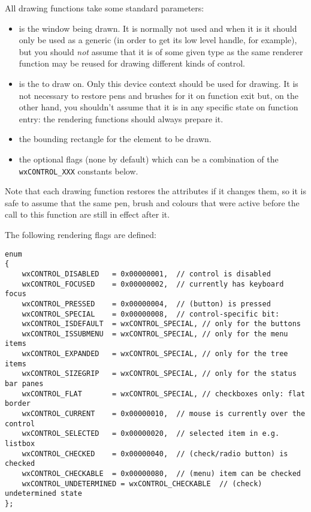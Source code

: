 All drawing functions take some standard parameters:
\begin{itemize}
\item {} is the window being drawn. It is normally not used and when
it is it should only be used as a generic  
(in order to get its low level handle, for example), but you should
\emph{not} assume that it is of some given type as the same renderer
function may be reused for drawing different kinds of control.
\item {} is the  to draw on. Only this device
context should be used for drawing. It is not necessary to restore
pens and brushes for it on function exit but, on the other hand, you
shouldn't assume that it is in any specific state on function entry:
the rendering functions should always prepare it.
\item {} the bounding rectangle for the element to be drawn.
\item {} the optional flags (none by default) which can be a
combination of the \texttt{wxCONTROL\_XXX} constants below.
\end{itemize}

Note that each drawing function restores the  attributes if
it changes them, so it is safe to assume that the same pen, brush and colours
that were active before the call to this function are still in effect after it.



The following rendering flags are defined:

\begin{verbatim}
enum
{
    wxCONTROL_DISABLED   = 0x00000001,  // control is disabled
    wxCONTROL_FOCUSED    = 0x00000002,  // currently has keyboard focus
    wxCONTROL_PRESSED    = 0x00000004,  // (button) is pressed
    wxCONTROL_SPECIAL    = 0x00000008,  // control-specific bit:
    wxCONTROL_ISDEFAULT  = wxCONTROL_SPECIAL, // only for the buttons
    wxCONTROL_ISSUBMENU  = wxCONTROL_SPECIAL, // only for the menu items
    wxCONTROL_EXPANDED   = wxCONTROL_SPECIAL, // only for the tree items
    wxCONTROL_SIZEGRIP   = wxCONTROL_SPECIAL, // only for the status bar panes
    wxCONTROL_FLAT       = wxCONTROL_SPECIAL, // checkboxes only: flat border
    wxCONTROL_CURRENT    = 0x00000010,  // mouse is currently over the control
    wxCONTROL_SELECTED   = 0x00000020,  // selected item in e.g. listbox
    wxCONTROL_CHECKED    = 0x00000040,  // (check/radio button) is checked
    wxCONTROL_CHECKABLE  = 0x00000080,  // (menu) item can be checked
    wxCONTROL_UNDETERMINED = wxCONTROL_CHECKABLE  // (check) undetermined state
};
\end{verbatim}

